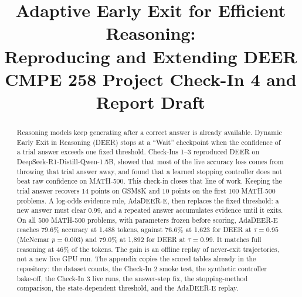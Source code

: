 \documentclass[conference]{IEEEtran}
\begin{document}
\title{Adaptive Early Exit for Efficient Reasoning:\\
Reproducing and Extending DEER\\
{\large CMPE 258 Project Check-In 4 and Report Draft}}

\author{
\and
{}
\and
{}
}

\maketitle

\begin{abstract}
Reasoning models keep generating after a correct answer is already available.
Dynamic Early Exit in Reasoning (DEER) stops at a ``Wait'' checkpoint when the confidence of a trial answer exceeds one fixed threshold.
Check-Ins 1--3 reproduced DEER on DeepSeek-R1-Distill-Qwen-1.5B, showed that most of the live accuracy loss comes from throwing that trial answer away, and found that a learned stopping controller does not beat raw confidence on MATH-500.
This check-in closes that line of work.
Keeping the trial answer recovers 14 points on GSM8K and 10 points on the first 100 MATH-500 problems.
A log-odds evidence rule, AdaDEER-E, then replaces the fixed threshold: a new answer must clear $0.99$, and a repeated answer accumulates evidence until it exits.
On all 500 MATH-500 problems, with parameters frozen before scoring, AdaDEER-E reaches 79.6\% accuracy at 1{,}488 tokens, against 76.6\% at 1{,}623 for DEER at $\tau=0.95$ (McNemar $p=0.003$) and 79.0\% at 1{,}892 for DEER at $\tau=0.99$.
It matches full reasoning at 46\% of the tokens.
The gain is an offline replay of never-exit trajectories, not a new live GPU run.
The appendix copies the scored tables already in the repository: the dataset counts, the Check-In 2 smoke test, the synthetic controller bake-off, the Check-In 3 live runs, the answer-step fix, the stopping-method comparison, the state-dependent threshold, and the AdaDEER-E replay.
\end{abstract}
\end{document}
